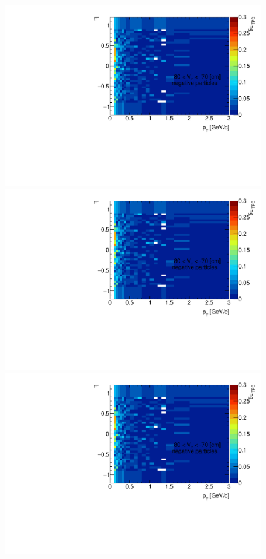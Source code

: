 \begin{figure}[H]
{	}~
	\parbox{0.325\textwidth}{
		\includegraphics[width=\linewidth,page=18]{graphics/systematicsEfficiency/deadMaterial/secondaries_Unbinned_Charged_SD.pdf}\\
		\includegraphics[width=\linewidth,page=21]{graphics/systematicsEfficiency/deadMaterial/secondaries_Unbinned_Charged_SD.pdf}\\
		\includegraphics[width=\linewidth,page=24]{graphics/systematicsEfficiency/deadMaterial/secondaries_Unbinned_Charged_SD.pdf}\\
}
\end{figure}
